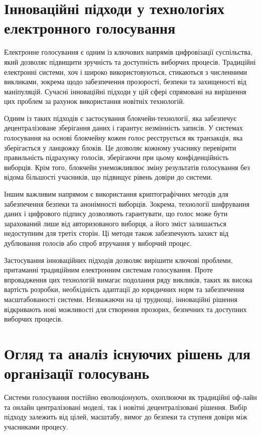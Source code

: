 \documentclass[14pt]{extreport}
\begin{document}
  \section{Інноваційні підходи у технологіях електронного голосування}
  
    Електронне голосування є одним із ключових напрямів цифровізації суспільства, який дозволяє підвищити зручність та доступність виборчих процесів. Традиційні електронні системи, хоч і широко використовуються, стикаються з численними викликами, зокрема щодо забезпечення прозорості, безпеки та захищеності від маніпуляцій. Сучасні інноваційні підходи у цій сфері спрямовані на вирішення цих проблем за рахунок використання новітніх технологій.

  Одним із таких підходів є застосування блокчейн-технології, яка забезпечує децентралізоване зберігання даних і гарантує незмінність записів. У системах голосування на основі блокчейну кожен голос реєструється як транзакція, яка зберігається у ланцюжку блоків. Це дозволяє кожному учаснику перевірити правильність підрахунку голосів, зберігаючи при цьому конфіденційність виборців. Крім того, блокчейн унеможливлює зміну результатів голосування без відома більшості учасників, що підвищує рівень довіри до системи.

  Іншим важливим напрямом є використання криптографічних методів для забезпечення безпеки та анонімності виборців. Зокрема, технології шифрування даних і цифрового підпису дозволяють гарантувати, що голос може бути зарахований лише від авторизованого виборця, а його зміст залишається недоступним для третіх сторін. Ці методи також забезпечують захист від дублювання голосів або спроб втручання у виборчий процес.

  Застосування інноваційних підходів дозволяє вирішити ключові проблеми, притаманні традиційним електронним системам голосування. Проте впровадження цих технологій вимагає подолання ряду викликів, таких як висока вартість розробки, необхідність адаптації до юридичних норм та забезпечення масштабованості системи. Незважаючи на ці труднощі, інноваційні рішення відкривають нові можливості для створення прозорих, безпечних та доступних виборчих процесів.
  
  \section{Огляд та аналіз існуючих рішень для організації голосувань}

  Системи голосування постійно еволюціонують, охоплюючи як традиційні оф-лайн та онлайн централізовані моделі, так і новітні децентралізовані рішення. Вибір підходу залежить від цілей, масштабу, вимог до безпеки та ступеня довіри між учасниками процесу.
\end{document}
